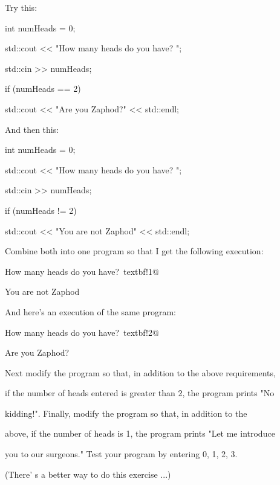 Try this:\\

\begin{console}[commandchars=\~\!\@]

int numHeads = 0;

std::cout << "How many heads do you have? ";

std::cin >> numHeads;

if (numHeads == 2)

   std::cout << "Are you Zaphod?" << std::endl;

\end{console}



And then this:



\begin{console}

int numHeads = 0;

std::cout << "How many heads do you have? ";

std::cin >> numHeads;

if (numHeads != 2)

   std::cout << "You are not Zaphod" << std::endl;

\end{console}



Combine both into one program so that I get the following execution:\\

\begin{console}[commandchars=\~\!\@]

How many heads do you have?~textbf!1@

You are not Zaphod

\end{console}

And here's an execution of the same program:\\

\begin{console}[commandchars=\~\!\@]

How many heads do you have?~textbf!2@

Are you Zaphod?

\end{console}

Next modify the program so that, in addition to the above requirements,

if the number of heads entered is greater than 2, the program prints "No

kidding!". Finally, modify the program so that, in addition to the

above, if the number of heads is 1, the program prints "Let me introduce

you to our surgeons." Test your program by entering 0, 1, 2, 3.



(There' s a better way to do this exercise ...)

